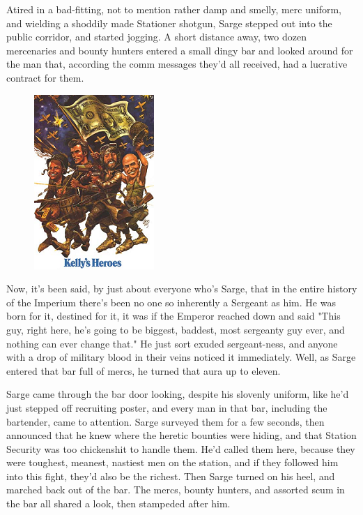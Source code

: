 Atired in a bad-fitting, not to mention rather damp and smelly, merc uniform, and wielding a shoddily made Stationer shotgun, Sarge stepped out into the public corridor, and started jogging. 
A short distance away, two dozen mercenaries and bounty hunters entered a small dingy bar and looked around for the man that, according the comm messages they'd all received, had a lucrative contract for them.

\begin{figure}
	\begin{center}
		\includegraphics[width=\figwidth]{pics/14/44.png}
	\end{center}
\end{figure}
Now, it's been said, by just about everyone who's Sarge, that in the entire history of the Imperium there's been no one so inherently a Sergeant as him. 
He was born for it, destined for it, it was if the Emperor reached down and said "This guy, right here, he's going to be biggest, baddest, most sergeanty guy ever, and nothing can ever change that." He just sort exuded sergeant-ness, and anyone with a drop of military blood in their veins noticed it immediately. 
Well, as Sarge entered that bar full of mercs, he turned that aura up to eleven.

Sarge came through the bar door looking, despite his slovenly uniform, like he'd just stepped off recruiting poster, and every man in that bar, including the bartender, came to attention. 
Sarge surveyed them for a few seconds, then announced that he knew where the heretic bounties were hiding, and that Station Security was too chickenshit to handle them. 
He'd called them here, because they were toughest, meanest, nastiest men on the station, and if they followed him into this fight, they'd also be the richest. 
Then Sarge turned on his heel, and marched back out of the bar. 
The mercs, bounty hunters, and assorted scum in the bar all shared a look, then stampeded after him.

